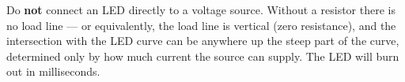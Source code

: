 \documentclass[11pt,letterpaper]{article}
\newcommand{\Vf}{V_f}
\newcommand{\Imax}{I_{max}}
\begin{document}
\begin{warnbox}
	Do \textbf{not} connect an LED directly to a voltage source. Without a resistor
	there is no load line --- or equivalently, the load line is vertical (zero resistance),
	and the intersection with the LED curve can be anywhere up the steep part of the curve,
	determined only by how much current the source can supply. The LED will burn out
	in milliseconds.
\end{warnbox}


%
%
%
%
\end{document}
